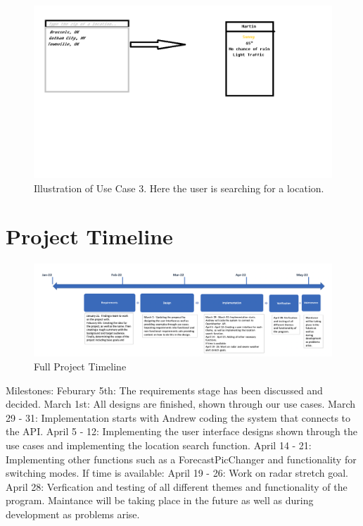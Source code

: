 \documentclass[10pt,conference,onecolumn,compsoc]{IEEEtran}
\begin{document}
\begin{figure}[ht!]
\includegraphics[scale=0.3]{use_case_3.png}
\caption{Illustration of Use Case 3. Here the user is searching for a location.}
\label{use_case_3}
\end{figure}


\section{Project Timeline}
\begin{figure}[ht !]
\includegraphics[scale = 0.3]{Timeline.png}
\caption{Full Project Timeline}
\label{TimeLine}
\end{figure}
Milestones:
Feburary 5th: The requirements stage has been discussed and decided.
March 1st: All designs are finished, shown through our use cases.
March 29 - 31: Implementation starts with Andrew coding the system that connects to the API.
April 5 - 12: Implementing the user interface designs shown through the use cases and implementing the location search function.
April 14 - 21: Implementing other functions such as a ForecastPicChanger and functionality for switching modes.
If time is available:
April 19 - 26: Work on radar stretch goal.
April 28: Verfication and testing of all different themes and functionality of the program.
Maintance will be taking place in the future as well as during development as problems arise.
\end{document}
